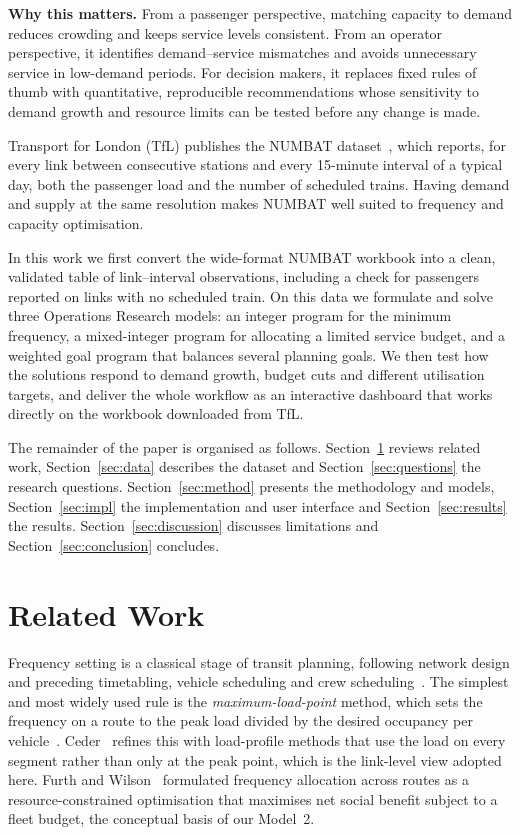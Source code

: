 \documentclass[conference]{IEEEtran}
\begin{document}
\textbf{Why this matters.} From a passenger perspective, matching capacity to demand reduces crowding and keeps
service levels consistent. From an operator perspective, it identifies demand--service mismatches and avoids
unnecessary service in low-demand periods. For decision makers, it replaces fixed rules of thumb with quantitative,
reproducible recommendations whose sensitivity to demand growth and resource limits can be tested before any change
is made.

Transport for London (TfL) publishes the NUMBAT dataset~\cite{tfl_numbat}, which reports, for every link between
consecutive stations and every 15-minute interval of a typical day, both the passenger load and the number of
scheduled trains. Having demand and supply at the same resolution makes NUMBAT well suited to frequency and
capacity optimisation.

In this work we first convert the wide-format NUMBAT workbook into a clean, validated table of link--interval
observations, including a check for passengers reported on links with no scheduled train. On this data we formulate
and solve three Operations Research models: an integer program for the minimum frequency, a mixed-integer program for
allocating a limited service budget, and a weighted goal program that balances several planning goals. We then test
how the solutions respond to demand growth, budget cuts and different utilisation targets, and deliver the whole
workflow as an interactive dashboard that works directly on the workbook downloaded from TfL.

The remainder of the paper is organised as follows. Section~\ref{sec:related} reviews related work,
Section~\ref{sec:data} describes the dataset and Section~\ref{sec:questions} the research questions.
Section~\ref{sec:method} presents the methodology and models, Section~\ref{sec:impl} the implementation and user
interface and Section~\ref{sec:results} the results. Section~\ref{sec:discussion} discusses limitations and
Section~\ref{sec:conclusion} concludes.

\section{Related Work}\label{sec:related}
Frequency setting is a classical stage of transit planning, following network design and preceding timetabling,
vehicle scheduling and crew scheduling~\cite{guihaire2008,desaulniers2007,ibarra2015}. The simplest and most widely
used rule is the \emph{maximum-load-point} method, which sets the frequency on a route to the peak load divided by
the desired occupancy per vehicle~\cite{ceder2016}. Ceder~\cite{ceder2016} refines this with load-profile methods that
use the load on every segment rather than only at the peak point, which is the link-level view adopted here.
Furth and Wilson~\cite{furth1981} formulated frequency allocation across routes as a resource-constrained
optimisation that maximises net social benefit subject to a fleet budget, the conceptual basis of our Model~2.
\end{document}

